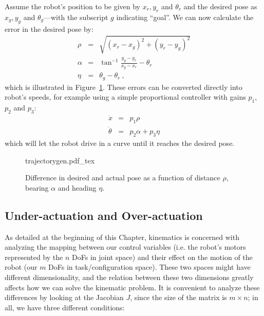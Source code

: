 Assume the robot's position to be given by $x_r, y_r$ and $\theta_r$ and the desired pose as $x_g, y_g$ and $\theta_g$---with the subscript $g$ indicating ``goal''.
We can now calculate the error in the desired pose by:
\begin{eqnarray}
\rho  &=& \sqrt{(x_r-x_g)^2+(y_r-y_g)^2} \nonumber \\
\alpha&=& \tan^{-1}{\frac{y_g-y_r}{x_g-x_r}}-\theta_r \\
\eta  &=& \theta_g-\theta_r\ , \nonumber
\end{eqnarray}
which is illustrated in Figure~\ref{fig:trajectorygen}.
These errors can be converted directly into robot's speeds, for example using a simple proportional controller with gains $p_1$, $p_2$ and $p_3$:
\begin{eqnarray}
\dot{x} &=& p_1 \rho\\
\dot{\theta} &=& p_2 \alpha + p_3 \eta
\end{eqnarray}
which will let the robot drive in a curve until it reaches the desired pose.

\begin{figure}
    \centering
    \def\svgwidth{\textwidth}
    {trajectorygen.pdf_tex}
    \caption{Difference in desired and actual pose as a function of distance $\rho$, bearing $\alpha$ and heading $\eta$.}
    \label{fig:trajectorygen}
\end{figure}


\subsection{Under-actuation and Over-actuation}\label{sec:kinematics:diff:underover}

As detailed at the beginning of this Chapter, kinematics is concerned with analyzing the mapping between our control variables (i.e. the robot's motors represented by the $n$ DoFs in joint space) and their effect on the motion of the robot (our $m$ DoFs in task/configuration space). These two spaces might have different dimensionality, and the relation between these two dimensions greatly affects how we can solve the kinematic problem. It is convenient to analyze these differences by looking at the Jacobian $J$, since the size of the matrix is $m \times n$; in all, we have three different conditions:

